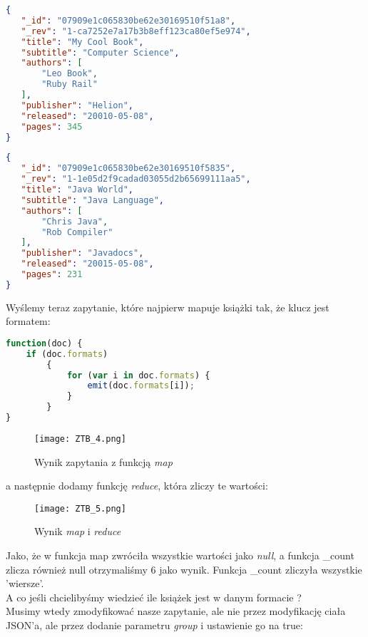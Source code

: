\documentclass[a4paper,15pt]{article}
\begin{document}
\begin{lstlisting}[language=json,firstnumber=1]
{
   "_id": "07909e1c065830be62e30169510f51a8",
   "_rev": "1-ca7252e7a17b3b8eff123ca80ef5e974",
   "title": "My Cool Book",
   "subtitle": "Computer Science",
   "authors": [
       "Leo Book",
       "Ruby Rail"
   ],
   "publisher": "Helion",
   "released": "20010-05-08",
   "pages": 345
}
\end{lstlisting}

\begin{lstlisting}[language=json,firstnumber=1]
{
   "_id": "07909e1c065830be62e30169510f5835",
   "_rev": "1-1e05d2f9cadad03055d2b65699111aa5",
   "title": "Java World",
   "subtitle": "Java Language",
   "authors": [
       "Chris Java",
       "Rob Compiler"
   ],
   "publisher": "Javadocs",
   "released": "20015-05-08",
   "pages": 231
}
\end{lstlisting}

Wyślemy teraz zapytanie, które najpierw mapuje książki tak, że klucz jest formatem:

\begin{lstlisting}[language=JavaScript]
function(doc) {
	if (doc.formats) 
		{
			for (var i in doc.formats) {
				emit(doc.formats[i]);
			}
		}
}
\end{lstlisting}

\begin{figure}[H]
\centering
  \texttt{[image: ZTB\_4.png]}
  \caption{Wynik zapytania z funkcją \textit{map}}
\end{figure}

a następnie dodamy funkcję \textit{reduce}, która zliczy te wartości:

\begin{figure}[H]
\centering
  \texttt{[image: ZTB\_5.png]}
  \caption{Wynik \textit{map} i \textit{reduce}}
\end{figure}

Jako, że w funkcja map zwróciła wszystkie wartości jako \textit{null}, a funkcja \_count zlicza również null otrzymaliśmy 6 jako wynik. Funkcja \_count zliczyła wszystkie 'wiersze'. \\

A co jeśli chcielibyśmy wiedzieć ile książek jest w danym formacie ? \\

Musimy wtedy zmodyfikować nasze zapytanie, ale nie przez modyfikację ciała JSON'a, ale przez dodanie parametru \textit{group} i ustawienie go na true: 
\end{document}
